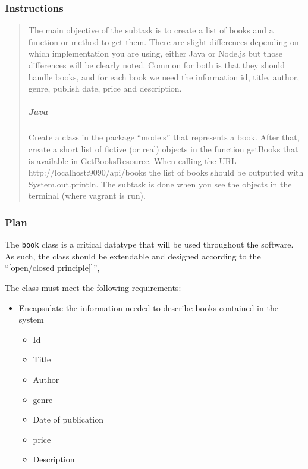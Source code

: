\subsubsection{Instructions}\label{task-1a-instructions}

\begin{quote}
	The main objective of the subtask is to create a list of books and a function
	or method to get them. There are slight differences depending on which
	implementation you are using, either Java or Node.js but those differences
	will be clearly noted. Common for both is that they should handle books, and
	for each book we need the information id, title, author, genre, publish date,
  price and description.

\mbox{}%
\subparagraph{Java}\label{java}

Create a class in the package ``models'' that represents a book. After
that, create a short list of fictive (or real) objects in the function
getBooks that is available in GetBooksResource. When calling the URL
http://localhost:9090/api/books the list of books should be outputted
with System.out.println. The subtask is done when you see the objects in
the terminal (where vagrant is run).
\end{quote}

\subsubsection{Plan}\label{plan}

The \texttt{book} class is a critical datatype that will be used
throughout the software. As such, the class should be extendable and
designed according to the ``{[}open/closed principle{]}{]}'',

The class must meet the following requirements:

\begin{itemize}
\tightlist
\item
  Encapsulate the information needed to describe books contained in the
  system

  \begin{itemize}
  \tightlist
  \item
    Id
  \item
    Title
  \item
    Author
  \item
    genre
  \item
    Date of publication
  \item
    price
  \item
    Description
  \end{itemize}
\end{itemize}

